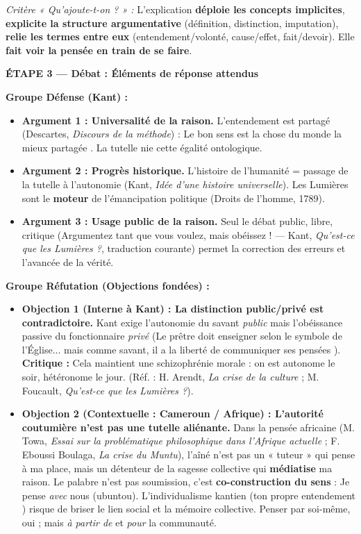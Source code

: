\documentclass[11pt]{article}
\newcommand{\cle}[1]{{\popxbold\color{popdark}#1}}
\begin{document}
\begin{exoresolu}
\textit{Critère « Qu'ajoute-t-on ? » :} L'explication \textbf{déploie les concepts implicites}, \textbf{explicite la structure argumentative} (définition, distinction, imputation), \textbf{relie les termes entre eux} (entendement/volonté, cause/effet, fait/devoir). Elle \textbf{fait voir la pensée en train de se faire}.

\vspace{0.5cm}
\textbf{ÉTAPE 3 — Débat : Éléments de réponse attendus}

\textbf{Groupe Défense (Kant) :}
\begin{itemize}
    \item \textbf{Argument 1 : Universalité de la raison.} L'entendement est \cle{partagé} (Descartes, \emph{Discours de la méthode}) : \guillemotleft Le bon sens est la chose du monde la mieux partagée \guillemotright. La tutelle nie cette égalité ontologique.
    \item \textbf{Argument 2 : Progrès historique.} L'histoire de l'humanité = passage de la tutelle à l'autonomie (Kant, \emph{Idée d'une histoire universelle}). Les Lumières sont le \textbf{moteur} de l'émancipation politique (Droits de l'homme, 1789).
    \item \textbf{Argument 3 : Usage public de la raison.} Seul le débat public, libre, critique (\guillemotleft Argumentez tant que vous voulez, mais obéissez ! \guillemotright — Kant, \emph{Qu'est-ce que les Lumières ?}, traduction courante) permet la correction des erreurs et l'avancée de la vérité.
\end{itemize}

\textbf{Groupe Réfutation (Objections fondées) :}
\begin{itemize}
    \item \textbf{Objection 1 (Interne à Kant) : La distinction public/privé est contradictoire.} Kant exige l'autonomie du savant \emph{public} mais l'obéissance passive du fonctionnaire \emph{privé} (\guillemotleft Le prêtre doit enseigner selon le symbole de l'Église... mais comme savant, il a la liberté de communiquer ses pensées \guillemotright). \textbf{Critique :} Cela maintient une \cle{schizophrénie morale} : on est autonome le soir, hétéronome le jour. (Réf. : H. Arendt, \emph{La crise de la culture} ; M. Foucault, \emph{Qu'est-ce que les Lumières ?}).
    \item \textbf{Objection 2 (Contextuelle : Cameroun / Afrique) : L'autorité coutumière n'est pas une tutelle aliénante.} Dans la pensée africaine (M. Towa, \emph{Essai sur la problématique philosophique dans l'Afrique actuelle} ; F. Eboussi Boulaga, \emph{La crise du Muntu}), l'aîné n'est pas un « tuteur » qui pense à ma place, mais un \cle{détenteur de la sagesse collective} qui \textbf{médiatise} ma raison. Le \cle{palabre} n'est pas soumission, c'est \textbf{co-construction du sens} : \guillemotleft Je pense \emph{avec} nous \guillemotright (ubuntou). L'individualisme kantien (\guillemotleft ton propre entendement \guillemotright) risque de briser le \cle{lien social} et la \cle{mémoire collective}. Penser par soi-même, oui ; mais \emph{à partir de} et \emph{pour} la communauté.
\end{itemize}


\end{exoresolu}
\end{document}
